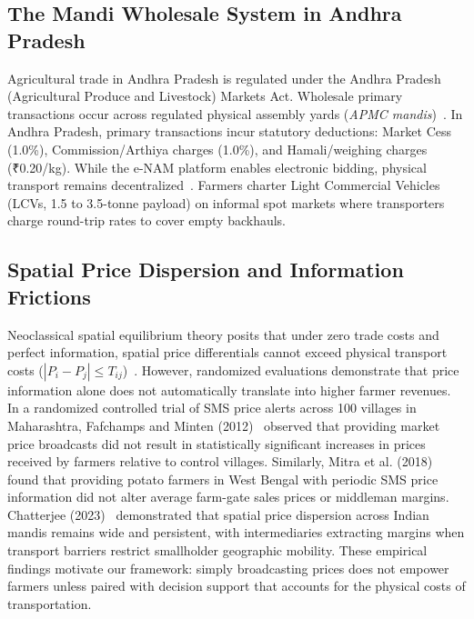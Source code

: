 \documentclass[journal]{IEEEtran}
\begin{document}
\subsection{The Mandi Wholesale System in Andhra Pradesh}
Agricultural trade in Andhra Pradesh is regulated under the Andhra Pradesh (Agricultural Produce and Livestock) Markets Act. Wholesale primary transactions occur across regulated physical assembly yards (\textit{APMC mandis})~\cite{sekhar2021agricultural}. In Andhra Pradesh, primary transactions incur statutory deductions: Market Cess (1.0\%), Commission/Arthiya charges (1.0\%), and Hamali/weighing charges (₹0.20/kg). While the e-NAM platform enables electronic bidding, physical transport remains decentralized~\cite{sekhar2021agricultural}. Farmers charter Light Commercial Vehicles (LCVs, 1.5 to 3.5-tonne payload) on informal spot markets where transporters charge round-trip rates to cover empty backhauls.

\subsection{Spatial Price Dispersion and Information Frictions}
Neoclassical spatial equilibrium theory posits that under zero trade costs and perfect information, spatial price differentials cannot exceed physical transport costs ($|P_i - P_j| \le T_{ij}$)~\cite{takayama1971spatial, fackler2001spatial}. However, randomized evaluations demonstrate that price information alone does not automatically translate into higher farmer revenues. In a randomized controlled trial of SMS price alerts across 100 villages in Maharashtra, Fafchamps and Minten (2012)~\cite{fafchamps2012impact} observed that providing market price broadcasts did not result in statistically significant increases in prices received by farmers relative to control villages. Similarly, Mitra et al. (2018)~\cite{mitra2018asymmetric} found that providing potato farmers in West Bengal with periodic SMS price information did not alter average farm-gate sales prices or middleman margins. Chatterjee (2023)~\cite{chatterjee2023market} demonstrated that spatial price dispersion across Indian mandis remains wide and persistent, with intermediaries extracting margins when transport barriers restrict smallholder geographic mobility. These empirical findings motivate our framework: simply broadcasting prices does not empower farmers unless paired with decision support that accounts for the physical costs of transportation.
\end{document}

